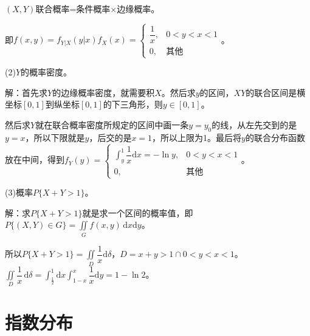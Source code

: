 \documentclass[UTF8, 12pt]{ctexart}
\begin{document}
$(X,Y)$联合概率=条件概率×边缘概率。

即$f(x,y)=f_{Y|X}(y|x)f_X(x)=\left\{\begin{array}{ll}
    \dfrac{1}{x}, & 0<y<x<1 \\
    0, & \text{其他}
\end{array}\right.$。

(2)$Y$的概率密度。

解：首先求$Y$的边缘概率密度，就需要积$X$。然后求$y$的区间，$XY$的联合区间是横坐标$[0,1]$到纵坐标$[0,1]$的下三角形，则$y\in[0,1]$。

然后求$Y$就在联合概率密度所规定的区间中画一条$y=y_0$的线，从左先交到的是$y=x$，所以下限就是$y$，后交的是$x=1$，所以上限为1。最后将$y$的联合分布函数放在中间，得到$f_Y(y)=\left\{\begin{array}{ll}
    \displaystyle{\int_y^1\dfrac{1}{x}\textrm{d}x}=-\ln y, & 0<y<x<1 \\
    0, & \text{其他}
\end{array}\right.$。

(3)概率$P\{X+Y>1\}$。

解：求$P\{X+Y>1\}$就是求一个区间的概率值，即$P\{(X,Y)\in G\}=\iint\limits_Gf(x,y)\,\textrm{d}x\textrm{d}y$。

\begin{multicols}{2}
    

    所以$P\{X+Y>1\}=\iint\limits_D\dfrac{1}{x}\textrm{d}\delta$，$D=x+y>1\cap0<y<x<1$。$\iint\limits_D\dfrac{1}{x}\,\textrm{d}\delta=\int_\frac{1}{2}^1\textrm{d}x\int_{1-x}^x\dfrac{1}{x}\textrm{d}y=1-\ln2$。

\end{multicols}

\section{指数分布}
\end{document}
